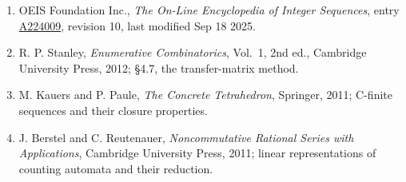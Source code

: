 \documentclass[11pt]{article}
\theoremstyle{definition}
\begin{document}
\begin{enumerate}

\item OEIS Foundation Inc., \emph{The On-Line Encyclopedia of Integer Sequences}, entry \href{https://oeis.org/A224009}{A224009}, revision 10, last modified Sep 18 2025.

\item R. P. Stanley, \emph{Enumerative Combinatorics}, Vol.~1, 2nd ed., Cambridge University Press, 2012; \S4.7, the transfer-matrix method.

\item M. Kauers and P. Paule, \emph{The Concrete Tetrahedron}, Springer, 2011; C-finite sequences and their closure properties.

\item J. Berstel and C. Reutenauer, \emph{Noncommutative Rational Series with Applications}, Cambridge University Press, 2011; linear representations of counting automata and their reduction.

\end{enumerate}
\end{document}
